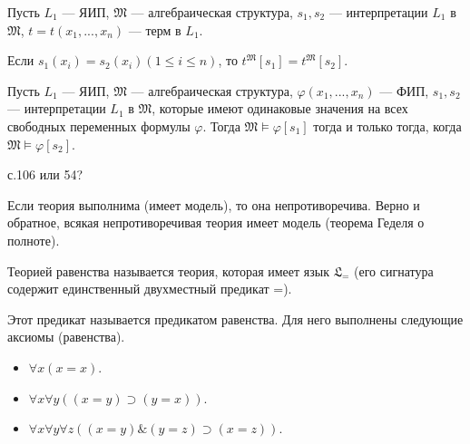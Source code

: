 
    \begin{Thm}
        Пусть $L_1$ --- ЯИП, $\mathfrak{M}$ --- алгебраическая структура, $s_1, s_2$ --- интерпретации $L_1$ в $\mathfrak{M}$, $t = t(x_1, ..., x_n)$ --- терм в $L_1$.

        Если $s_1(x_i) = s_2(x_i) (1 \leq i \leq n)$, то $t^{\mathfrak{M}}[s_1] = t^{\mathfrak{M}}[s_2]$.
    \end{Thm}


    \begin{Thm}[Об истинности]
        Пусть $L_1$ --- ЯИП, $\mathfrak{M}$ --- алгебраическая структура, $\varphi(x_1, ..., x_n)$ --- ФИП, $s_1, s_2$ --- интерпретации $L_1$ в $\mathfrak{M}$, которые имеют одинаковые значения на всех свободных переменных формулы $\varphi$. Тогда $\mathfrak{M} \models \varphi[s_1]$ тогда и только тогда, когда $\mathfrak{M} \models \varphi[s_2]$.
    \end{Thm}


    с.106 или 54?


    \begin{Thm}
        Если теория выполнима (имеет модель), то она непротиворечива. Верно и обратное, всякая непротиворечивая теория имеет модель (теорема Геделя о полноте). 
    \end{Thm}


    \begin{Def}
        Теорией равенства называется теория, которая имеет язык $\mathfrak{L}_=$ (его сигнатура содержит единственный двухместный предикат =).
        
        Этот предикат называется предикатом равенства. Для него выполнены следующие аксиомы (равенства).
        \begin{itemize}
            \item $\forall x (x = x)$.
            \item $\forall x \forall y ((x = y) \supset (y = x))$.
            \item $\forall x \forall y \forall z ((x = y) \& (y = z) \supset (x = z))$.
        \end{itemize}
    \end{Def}

